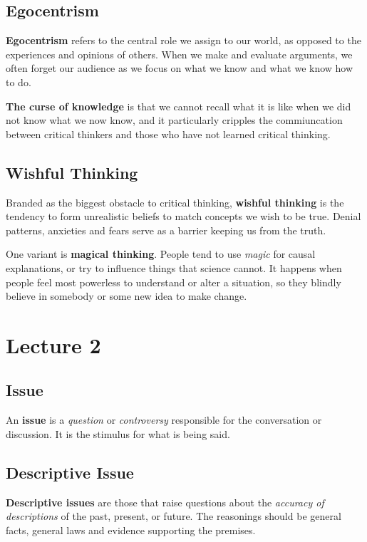 \documentclass{article}
\begin{document}
\subsection{Egocentrism}
\textbf{Egocentrism} refers to the central role we assign to our world, as opposed to the experiences and opinions of others. When we make and evaluate arguments, we often forget our audience as we focus on what we know and what we know how to do.

\textbf{The curse of knowledge} is that we cannot recall what it is like when we did not know what we now know, and it particularly cripples the commiuncation between critical thinkers and those who have not learned critical thinking.

\subsection{Wishful Thinking}
Branded as the biggest obstacle to critical thinking, \textbf{wishful thinking} is the tendency to form unrealistic beliefs to match concepts we wish to be true. Denial patterns, anxieties and fears serve as a barrier keeping us from the truth.

One variant is \textbf{magical thinking}. People tend to use \emph{magic} for causal explanations, or try to influence things that science cannot. It happens when people feel most powerless to understand or alter a situation, so they blindly believe in somebody or some new idea to make change.

\section{Lecture 2}

\subsection{Issue}
An \textbf{issue} is a \emph{question} or \emph{controversy} responsible for the conversation or discussion. It is the stimulus for what is being said.

\subsection{Descriptive Issue}
\textbf{Descriptive issues} are those that raise questions about the \emph{accuracy of descriptions} of the past, present, or future. The reasonings should be general facts, general laws and evidence supporting the premises.
\end{document}
